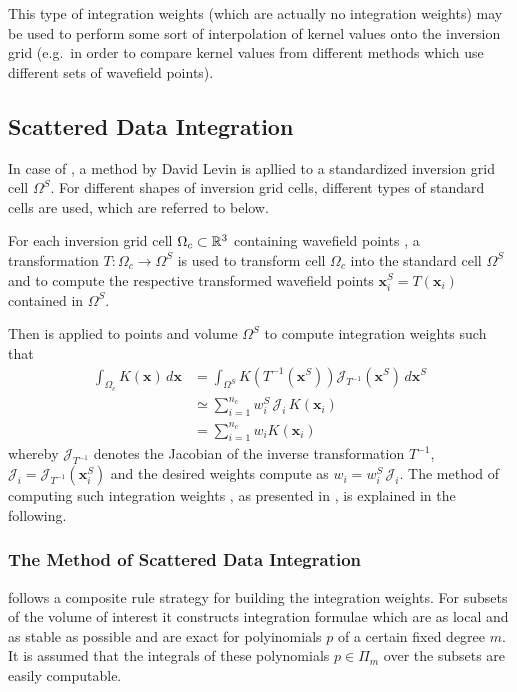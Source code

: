 This type of integration weights (which are actually no integration weights) may be used to perform some 
sort of interpolation of kernel values onto the inversion grid (e.g.~in order to compare kernel values 
from different methods which use different sets of wavefield points).
%
\subsection{Scattered Data Integration} \label{programs_scripts,sec:fmod_intw,sub:SDI}
%
In case of , a method by David Levin \cite{Levin99} is apllied to a
standardized inversion grid cell $\Omega^S$. For different shapes of inversion grid cells, different 
types of standard cells are used, which are referred to below.

For each inversion grid cell $\Omega_c \subset \mathbb{R}^3$ containing wavefield points \wpG, a transformation 
$T : \Omega_c \rightarrow \Omega^S$ is used to transform cell $\Omega_c$ into the standard cell $\Omega^S$ 
and to compute the respective transformed wavefield points $\mathbf{x}_i^S = T\left(\mathbf{x}_i\right)$ 
contained in $\Omega^S$.

Then \cite{Levin99} is applied to points \wpS and volume $\Omega^S$ to compute integration weights \weightsS
such that
\begin{align}
\int_{\Omega_c} K(\mathbf{x})\,d\mathbf{x} &= 
           \int_{\Omega^S} K\left(T^{-1}\left(\mathbf{x}^S\right)\right) 
           \mathcal{J}_{T^{-1}}\left(\mathbf{x}^S\right)\,d\mathbf{x}^S \nonumber \\
  &\simeq \sum_{i=1}^{n_c} w^S_i\,\mathcal{J}_i\,K(\mathbf{x}_i) 
   \label{programs_scripts,sec:fmod_intw,eq:integration_standard} \\
  & = \sum_{i=1}^{n_c} w_iK(\mathbf{x}_i) \nonumber
\end{align}
whereby $\mathcal{J}_{T^{-1}}$ denotes the Jacobian of the inverse transformation $T^{-1}$, $\mathcal{J}_i = 
\mathcal{J}_{T^{-1}}\left(\mathbf{x}^S_i\right)$ and the desired weights compute as $w_i = w^S_i \, \mathcal{J}_i$. 
The method of computing such integration weights \weightsS, as presented in \cite{Levin99}, is explained in 
the following.
%
\subsubsection{The Method of Scattered Data Integration}
%
\cite{Levin99}{} follows a composite rule strategy for building the integration weights. For subsets of the 
volume of interest it constructs integration formulae which are as local and as stable as possible and are 
exact for polyinomials $p$ of a certain fixed degree $m$. It is assumed that the integrals of these polynomials 
$p\in\Pi_m$ over the subsets are easily computable.

